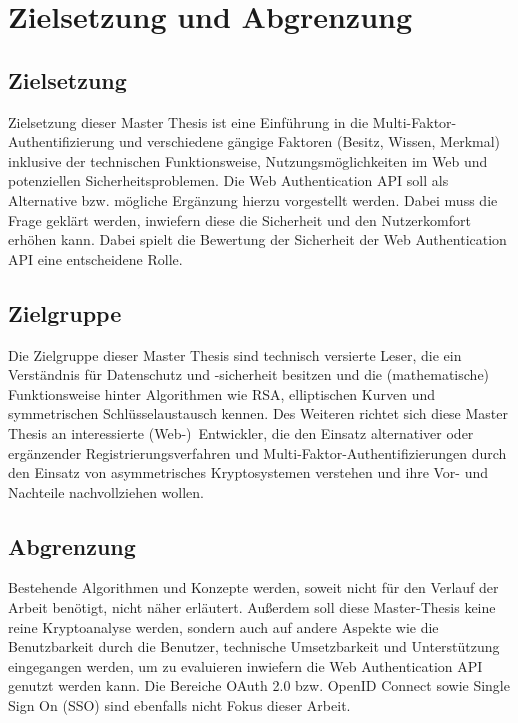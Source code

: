 \chapter{Zielsetzung und Abgrenzung}

\section{Zielsetzung}

Zielsetzung dieser Master Thesis ist eine Einführung in die Multi-Faktor-Authentifizierung und verschiedene gängige Faktoren (Besitz, Wissen, Merkmal) inklusive der technischen Funktionsweise, Nutzungsmöglichkeiten im Web und potenziellen Sicherheitsproblemen. Die Web Authentication API soll als Alternative bzw. mögliche Ergänzung hierzu vorgestellt werden. Dabei muss die Frage geklärt werden, inwiefern diese die Sicherheit und den Nutzerkomfort erhöhen kann. Dabei spielt die Bewertung der Sicherheit der Web Authentication API eine entscheidene Rolle.

\section{Zielgruppe}

Die Zielgruppe dieser Master Thesis sind technisch versierte Leser, die ein Verständnis für Datenschutz und -sicherheit besitzen und die (mathematische) Funktionsweise hinter 
Algorithmen wie RSA, elliptischen Kurven und symmetrischen Schlüsselaustausch kennen. Des Weiteren richtet sich diese Master Thesis an interessierte \mbox{(Web-) Entwickler}, die den Einsatz alternativer oder ergänzender Registrierungsverfahren und Multi-Faktor-Authentifizierungen durch den Einsatz von asymmetrisches Kryptosystemen verstehen und ihre Vor- und Nachteile nachvollziehen wollen.

\section{Abgrenzung}

Bestehende Algorithmen und Konzepte werden, soweit nicht für den Verlauf der Arbeit benötigt, nicht näher erläutert. Außerdem soll diese Master-Thesis keine reine Kryptoanalyse werden, sondern auch auf andere Aspekte wie die Benutzbarkeit durch die Benutzer, technische Umsetzbarkeit und Unterstützung eingegangen werden, um zu evaluieren inwiefern die Web Authentication API genutzt werden kann. Die Bereiche OAuth 2.0 bzw. OpenID Connect sowie Single Sign On (SSO) sind ebenfalls nicht Fokus dieser Arbeit.
